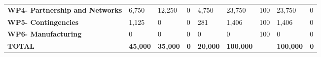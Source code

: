 \begin{table}[H]
{\begin{tabular}{p{5cm}p{2cm}p{2cm}p{2.5cm}p{2cm}p{2cm}p{2cm}p{2cm}p{2cm}}
\textbf{WP4- Partnership and Networks} & 6,750                                                                  & 12,250                                                             &0                                                                                 & 4,750                                                                        & 23,750                                                                                        & 100                        & 23,750                          & 0                                                                         \\
\textbf{WP5- Contingencies}                                                        & 1,125                                                                  & 0                                                                  &0                                                                                 & 281                                                                          & 1,406                                                                                         & 100                        & 1,406                           & 0                                                                         \\
\textbf{WP6- Manufacturing}                                                        & 0                                                                      & 0                                                                  &0                                                                                 & 0                                                                            & 0                                                                                             & 100                       & 0                               & 0                                                                         \\ \hline
\textbf{TOTAL}                                                                     & \textbf{45,000}                                                        & \textbf{35,000}                                                    & \textbf{0}                                                                      & \textbf{20,000}                                                              & \textbf{100,000}                                                                              & \textbf{}                    & \textbf{100,000}                & \textbf{0}                                                               
 \\ \bottomrule[2pt]
\end{tabular} }
\end{table}


